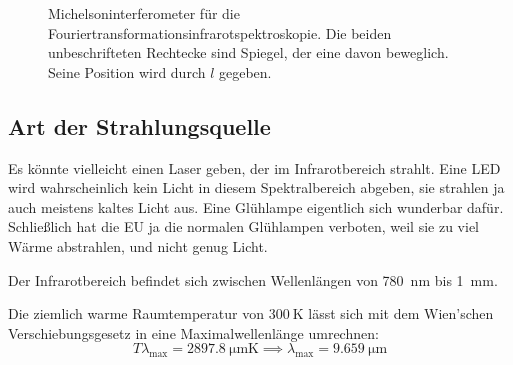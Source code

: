 \begin{figure}
	\centering
	\caption{%
		Michelsoninterferometer für die
		Fouriertransformationsinfrarotspektroskopie. Die beiden unbeschrifteten
		Rechtecke sind Spiegel, der eine davon beweglich. Seine Position wird
		durch $l$ gegeben.
	}
	\label{fig:2/a/Strahlteiler}
\end{figure}

\subsection{Art der Strahlungsquelle}

Es könnte vielleicht einen Laser geben, der im Infrarotbereich strahlt. Eine
LED wird wahrscheinlich kein Licht in diesem Spektralbereich abgeben, sie
strahlen ja auch meistens kaltes Licht aus. Eine Glühlampe eigentlich sich
wunderbar dafür. Schließlich hat die EU ja die normalen Glühlampen verboten,
weil sie zu viel Wärme abstrahlen, und nicht genug Licht.

Der Infrarotbereich befindet sich zwischen Wellenlängen von
\SI{780}{\nano\meter} bis \SI{1}{\milli\meter}.

Die ziemlich warme Raumtemperatur von $\SI{300}{\kelvin}$ lässt sich mit dem Wien'schen Verschiebungsgesetz in eine Maximalwellenlänge umrechnen:
\[
	T \lambda_\text{max} = \SI{2897.8}{\micro\meter\kelvin}
	\implies
	\lambda_\text{max} = \SI{9.659}{\micro\meter}
\]

\subsection{}

